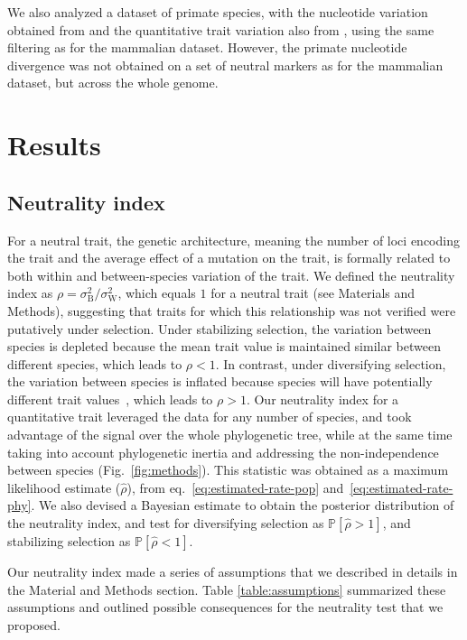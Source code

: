 \documentclass{article}
\newcommand{\proba}{\mathbb{P}}
\newcommand{\RateBetween}{\sigma^2_{\mathrm{B}}}
\newcommand{\RateWhithin}{\sigma^2_{\mathrm{W}}}
\newcommand{\NI}{\rho}
\newcommand{\EstNI}{\widehat{\rho}}
\begin{document}
We also analyzed a dataset of primate species, with the nucleotide variation obtained from \textcite{kuderna_global_2023} and the quantitative trait variation also from \textcite{tsuboi_breakdown_2018}, using the same filtering as for the mammalian dataset.
However, the primate nucleotide divergence was not obtained on a set of neutral markers as for the mammalian dataset, but across the whole genome.

\section*{Results}\label{sec:results}

\subsection*{Neutrality index}

For a neutral trait, the genetic architecture, meaning the number of loci encoding the trait and the average effect of a mutation on the trait, is formally related to both within and between-species variation of the trait.
We defined the neutrality index as $\NI = \RateBetween/\RateWhithin$, which equals $1$ for a neutral trait (see Materials and Methods), suggesting that traits for which this relationship was not verified were putatively under selection.
Under stabilizing selection, the variation between species is depleted because the mean trait value is maintained similar between different species, which leads to $\NI < 1$.
In contrast, under diversifying selection, the variation between species is inflated because species will have potentially different trait values~\parencite{hansen_stabilizing_1997}, which leads to $\NI > 1$.
Our neutrality index for a quantitative trait leveraged the data for any number of species, and took advantage of the signal over the whole phylogenetic tree, while at the same time taking into account phylogenetic inertia and addressing the non-independence between species (Fig.~\ref{fig:methods}).
This statistic was obtained as a maximum likelihood estimate ($\EstNI$), from eq.~\ref{eq:estimated-rate-pop} and~\ref{eq:estimated-rate-phy}.
We also devised a Bayesian estimate to obtain the posterior distribution of the neutrality index, and test for diversifying selection as $\proba [\EstNI > 1]$, and stabilizing selection as $\proba [\EstNI < 1]$.

Our neutrality index made a series of assumptions that we described in details in the Material and Methods section.
Table \ref{table:assumptions} summarized these assumptions and outlined possible consequences for the neutrality test that we proposed.
\end{document}

